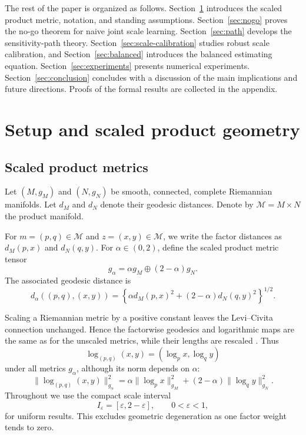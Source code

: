 \documentclass[11pt]{article}
\newcommand{\M}{\mathcal M}
\newcommand{\eps}{\varepsilon}
\newcommand{\1}{\mathbf{1}}
\begin{document}
The rest of the paper is organized as follows.  Section~\ref{sec:setup}
introduces the scaled product metric, notation, and standing assumptions.
Section~\ref{sec:nogo} proves the no-go theorem for naive joint scale learning.
Section~\ref{sec:path} develops the sensitivity-path theory.  Section~\ref{sec:scale-calibration}
studies robust scale calibration, and Section~\ref{sec:balanced} introduces the
balanced estimating equation.  Section~\ref{sec:experiments} presents numerical
experiments.  Section~\ref{sec:conclusion} concludes with a discussion of the
main implications and future directions. Proofs of the formal results are collected in the appendix.


\section{Setup and scaled product geometry}\label{sec:setup}

\subsection{Scaled product metrics}

Let $(M,g_M)$ and $(N,g_N)$ be smooth, connected, complete Riemannian manifolds.  Let $d_M$ and $d_N$ denote their geodesic distances.  Denote by 
$
 \M=M\times N
$
the product manifold.

For $m=(p,q)\in\M$ and $z=(x,y)\in\M$, we write the factor distances as
$d_M(p,x)$ and $d_N(q,y)$. For $\alpha\in(0,2)$, define the scaled product metric tensor
\begin{equation}\label{eq:g-alpha}
 g_\alpha=\alpha g_M\oplus(2-\alpha)g_N.
\end{equation}
The associated geodesic distance is
\begin{equation}\label{eq:d-alpha}
 d_\alpha((p,q),(x,y))
 =\left\{\alpha d_M(p,x)^2+(2-\alpha)d_N(q,y)^2\right\}^{1/2}.
\end{equation}

Scaling a Riemannian metric by a positive constant leaves the Levi--Civita
connection unchanged.  Hence the factorwise geodesics and logarithmic maps are
the same as for the unscaled metrics, while their lengths are rescaled \citep{you_2026_ConstantMetricScaling}.  Thus
\[
 \log_{(p,q)}(x,y)=(\log_p x,\log_q y)
\]
under all metrics $g_\alpha$, although its norm depends on $\alpha$:
\[
 \|\log_{(p,q)}(x,y)\|_{g_\alpha}^2
 =\alpha\|\log_p x\|_{g_M}^2+(2-\alpha)\|\log_q y\|_{g_N}^2.
\]
Throughout we use the compact scale interval
\begin{equation}\label{eq:Ieps}
 I_\eps=[\eps,2-\eps],
 \qquad 0<\eps<1,
\end{equation}
for uniform results.  This excludes geometric degeneration as one factor weight tends to zero.
\end{document}
